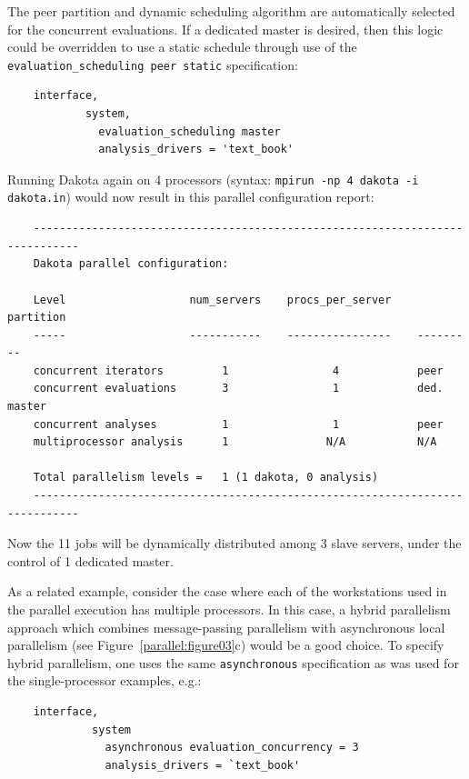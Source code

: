 The peer partition and dynamic scheduling algorithm are
automatically selected for the concurrent evaluations. If a
dedicated master is desired, then this logic could be
overridden to use a static schedule through use of the
\texttt{evaluation\_scheduling peer static} specification:
\begin{small}
\begin{verbatim}
    interface,
            system,
              evaluation_scheduling master
              analysis_drivers = 'text_book'
\end{verbatim}
\end{small}

Running Dakota again on 4 processors (syntax: \texttt{mpirun -np 4
  dakota -i dakota.in}) would now result in this parallel
configuration report:
\begin{small}
\begin{verbatim}
    -----------------------------------------------------------------------------
    Dakota parallel configuration:

    Level                   num_servers    procs_per_server    partition
    -----                   -----------    ----------------    ---------
    concurrent iterators         1                4            peer
    concurrent evaluations       3                1            ded. master
    concurrent analyses          1                1            peer
    multiprocessor analysis      1               N/A           N/A

    Total parallelism levels =   1 (1 dakota, 0 analysis)
    -----------------------------------------------------------------------------
\end{verbatim}
\end{small}

Now the 11 jobs will be dynamically distributed among 3 slave servers,
under the control of 1 dedicated master.

As a related example, consider the case where each of the workstations
used in the parallel execution has multiple processors. In this case,
a hybrid parallelism approach which combines message-passing
parallelism with asynchronous local parallelism (see
Figure~\ref{parallel:figure03}c) would be a good choice. To specify
hybrid parallelism, one uses the same \texttt{asynchronous}
specification as was used for the single-processor examples, e.g.:
\begin{small}
\begin{verbatim}
    interface,
             system
               asynchronous evaluation_concurrency = 3
               analysis_drivers = `text_book'
\end{verbatim}
\end{small}

